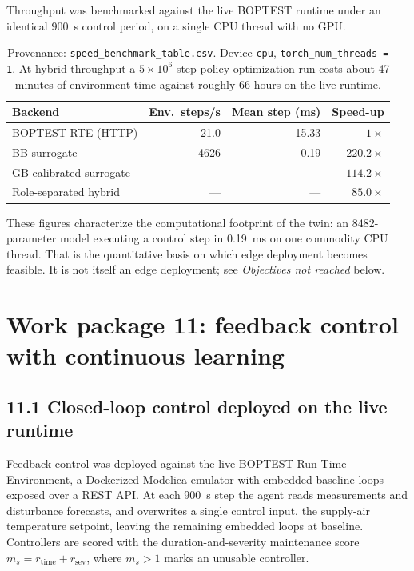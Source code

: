 \documentclass[11pt,a4paper]{article}
\newcommand{\ms}{\ensuremath{m_s}}
\begin{document}
Throughput was benchmarked against the live BOPTEST runtime under an identical
\SI{900}{\second} control period, on a single CPU thread with no GPU.

\begin{table}[h]
\centering\small
\begin{tabular}{@{}lrrr@{}}
\toprule
Backend & Env.\ steps/s & Mean step (\si{\milli\second}) & Speed-up \\
\midrule
BOPTEST RTE (HTTP) & 21.0 & 15.33 & $1\times$ \\
BB surrogate & 4626 & 0.19 & $220.2\times$ \\
GB calibrated surrogate & --- & --- & $114.2\times$ \\
Role-separated hybrid & --- & --- & $85.0\times$ \\
\bottomrule
\end{tabular}
\caption*{\small Provenance: \texttt{speed\_benchmark\_table.csv}. Device \texttt{cpu},
\texttt{torch\_num\_threads = 1}. At hybrid throughput a $5\times10^{6}$-step policy-optimization
run costs about 47 minutes of environment time against roughly 66 hours on the live runtime.}
\end{table}

These figures characterize the computational footprint of the twin: an 8482-parameter model
executing a control step in \SI{0.19}{\milli\second} on one commodity CPU thread. That is the
quantitative basis on which edge deployment becomes feasible. It is not itself an edge
deployment; see \emph{Objectives not reached} below.

\section*{Work package 11: feedback control with continuous learning}

\subsection*{11.1 Closed-loop control deployed on the live runtime}

Feedback control was deployed against the live BOPTEST Run-Time Environment, a Dockerized
Modelica emulator with embedded baseline loops exposed over a REST API. At each
\SI{900}{\second} step the agent reads measurements and disturbance forecasts, and overwrites a
single control input, the supply-air temperature setpoint, leaving the remaining embedded loops
at baseline. Controllers are scored with the duration-and-severity maintenance score
$\ms = r_{\mathrm{time}} + r_{\mathrm{sev}}$, where $\ms > 1$ marks an unusable controller.
\end{document}
